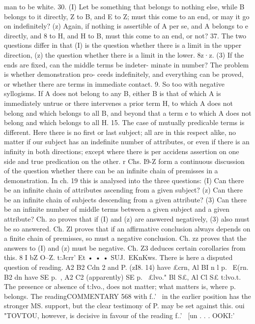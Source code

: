 {{{{{{{{{{{{{{{{{man to be white.
30. (I) Let be something that belongs to nothing else, while
B belongs to it directly, Z to B, and E to Z; must this come to
an end, or may it go on indefinitely? (z) Again, if nothing is
assertible of A per se, and A belongs to e directly, and 8 to H,
and H to B, must this come to an end, or not?
37. The two questions differ in that (I) is the question whether
there is a limit in the upper direction, (z) the question whether
there is a limit in the lower.
8z·z. (3) If the ends are fixed, can the middle terms be indeter-
minate in number? The problem is whether demonstration pro-
ceeds indefinitely, and everything can be proved, or whether
there are terms in immediate contact.
9. So too with negative syllogisms. If A does not belong to
any B, either B is that of which A is immediately untrue or there
intervenes a prior term H, to which A does not belong and which
belongs to all B, and beyond that a term e to which A does not
belong and which belongs to all H.
15. The case of mutually predicable terms is different. Here
there is no first or last subject; all are in this respect alike, no
matter if our subject has an indefinite number of attributes,
or even if there is an infinity in both directions; except where
there is per accidens assertion on one side and true predication
on the other.
r
Chs. I9-Z} form a continuous discussion of the question whether
there can be an infinite chain of premisses in a demonstration.
In ch. 19 this is analysed into the three questions: (I) Can there
be an infinite chain of attributes ascending from a given subject?
(z) Can there be an infinite chain of subjects descending from a
given attribute? (3) Can there be an infinite number of middle
terms between a given subject and a given attribute? Ch. zo
proves that if (I) and (z) are answered negatively, (3) also must
be so answered. Ch. Zl proves that if an affirmative conclusion
always depends on a finite chain of premisses, so must a negative
conclusion. Ch. zz proves that the answers to (I) and (z) must be
negative. Ch. Z3 deduces certain corollaries from this.
8 I bZ O--Z. t:Jcrr' Et • • • SUJ.~EKnKws. There is here a disputed
question of reading. A2 B2 Cdn 2 and P. (zI8. 14) have £crn,
Al BI n l p.~ E(rn. B2 dn have SE p.~, A2 C2 (apparently) SE p.~
£lvo." Bl S£, Al Cl S£ t:lvo.t. The presence or absence of t:lvo., does
not matter; what matters is, where p.~ belongs. The readingCOMMENTARY
568
with f..'~ in the earlier position has the stronger MS. support, but
the clear testimony of P. may be set against this. oui "TOVTOU,
however, is decisive in favour of the reading f..'~ [un . . . OOKI:'
}}}}}}}}}}}}}}}}
